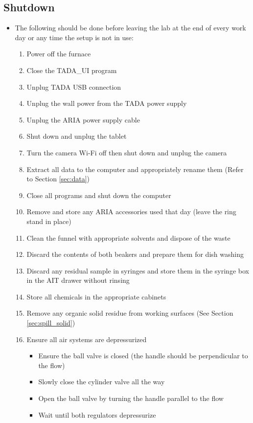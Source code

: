 \documentclass[letterpaper,11pt]{article}
\begin{document}
\subsection{Shutdown}
    \begin{itemize}
    \item The following should be done before leaving the lab at the end of 
        every work day or any time the setup is not in use:
        \begin{enumerate}
        \item Power off the furnace
        \item Close the TADA\_UI program
        \item Unplug TADA USB connection
        \item Unplug the wall power from the TADA power supply
        \item Unplug the ARIA power supply cable
        \item Shut down and unplug the tablet
        \item Turn the camera Wi-Fi off then shut down and unplug the camera
        \item Extract all data to the computer and appropriately rename them 
            (Refer to Section \ref{sec:data})
        \item Close all programs and shut down the computer
        
        \item Remove and store any ARIA accessories used that day (leave the 
            ring stand in place)
        \item Clean the funnel with appropriate solvents and dispose of the waste
        \item Discard the contents of both beakers and prepare them for dish washing
        \item Discard any residual sample in syringes and store them in the syringe box in the AIT
            drawer without rinsing %
        \item Store all chemicals in the appropriate cabinets
        \item Remove any organic solid residue from working surfaces 
            (See Section \ref{sec:spill_solid})
		
		\item Ensure all air systems are depressurized 
			\begin{itemize}
			\item Ensure the ball valve is closed (the handle should be perpendicular to the flow)
			\item Slowly close the cylinder valve all the way
			\item Open the ball valve by turning the handle parallel to the flow
            \item Wait until both regulators depressurize
			\end{itemize}
        \end{enumerate}
    

\end{itemize}
\end{document}
